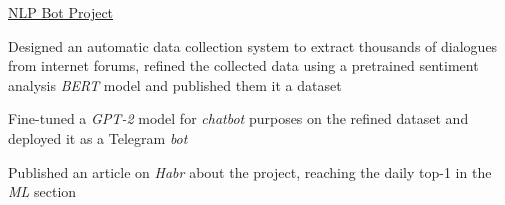 \begin{cventries}
  \cventry
    {} %
    {\faGithub\acvHeaderIconSep\href{https://github.com/BlackSamorez/ebanko}{NLP Bot Project}} %
    {} %
    {} %
    {
      \begin{cvitems} %
        \item {Designed an automatic data collection system to extract thousands of dialogues from internet forums, refined the collected data using a pretrained sentiment analysis \textit{BERT} model and published them it a dataset}
        \item {Fine-tuned a \textit{GPT-2} model for \textit{chatbot} purposes on the refined dataset and deployed it as a Telegram \textit{bot}}
        \item {Published an article on \textit{Habr} about the project, reaching the daily top-1 in the \textit{ML} section}
      \end{cvitems}
    }
    

\end{cventries}